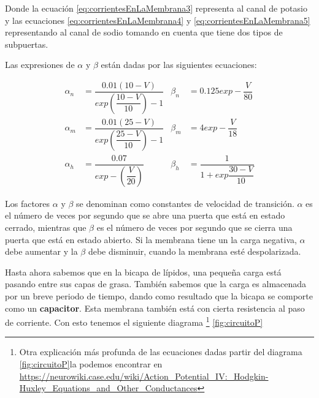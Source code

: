 Donde la ecuación \ref{eq:corrientesEnLaMembrana3} representa al canal de potasio y las ecuaciones \ref{eq:corrientesEnLaMembrana4} y \ref{eq:corrientesEnLaMembrana5} representando al canal de sodio tomando en cuenta que tiene dos tipos de subpuertas.

Las expresiones de \(\alpha\) y \(\beta\) están dadas por las siguientes ecuaciones:

\begin{align*}
\alpha_{n}&=\dfrac{0.01(10-V)}{exp(\dfrac{10-V}{10})-1}           &  \beta_{n}&=0.125exp-\dfrac{V}{80}\\
\alpha_{m}&=\dfrac{0.01(25-V)}{exp(\dfrac{25-V}{10})-1}                    &  \beta_{m}&=4exp-\dfrac{V}{18}\\
\alpha_{h}&=\dfrac{0.07}{exp-(\dfrac{V}{20})}              &  \beta_{h}&=\dfrac{1}{1+exp\dfrac{30-V}{10}}
\end{align*}

Los factores \(\alpha\) y \(\beta\) se denominan como constantes de velocidad de transición. \(\alpha\) es el número de veces por segundo que se abre una puerta que está en estado cerrado, mientras que \(\beta\) es el número de veces por segundo que se cierra una puerta que está en estado abierto. Si la membrana tiene un la carga negativa, \(\alpha\) debe aumentar y la \(\beta\) debe disminuir, cuando la membrana esté despolarizada.

Hasta ahora sabemos que en la bicapa de lípidos, una pequeña carga está pasando entre sus capas de grasa. También sabemos que la carga es almacenada por un breve periodo de tiempo, dando como resultado que la bicapa se comporte como un \textbf{capacitor}. Esta membrana también está con cierta resistencia al paso de corriente. Con esto tenemos el siguiente diagrama \footnote{Otra explicación más profunda de las ecuaciones dadas partir del diagrama \ref{fig:circuitoP}la podemos encontrar en \url{https://neurowiki.case.edu/wiki/Action_Potential_IV:_Hodgkin-Huxley_Equations_and_Other_Conductances}} \ref{fig:circuitoP}

